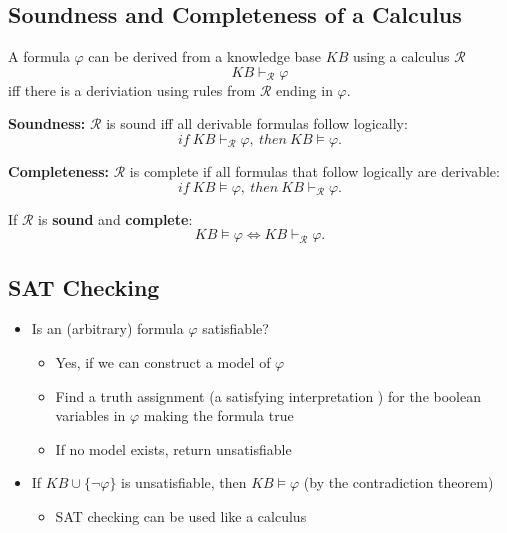 \documentclass[conference, a4paper]{styles/acmsiggraph}
\begin{document}
    
    \subsection{Soundness and Completeness of a Calculus}
        A formula $\varphi$ can be derived from a knowledge base $KB$ using a calculus $\mathcal{R}$
            $$KB \vdash_{\mathcal{R}} \varphi$$
        iff there is a deriviation using rules from $\mathcal{R}$ ending in $\varphi$.\newline
        
        \textbf{Soundness:} $\mathcal{R}$ is sound iff all derivable formulas follow logically:
            $$if \  KB \vdash_{\mathcal{R}} \varphi, \  then \  KB \vDash \varphi.$$
        
        \textbf{Completeness:} $\mathcal{R}$ is complete if all formulas that follow logically are derivable:
            $$if \  KB \vDash \varphi, \  then \  KB \vdash_{\mathcal{R}} \varphi.$$
        
        If $\mathcal{R}$ is \textbf{sound} and \textbf{complete}:
            $$KB \vDash \varphi \Leftrightarrow KB \vdash_{\mathcal{R}} \varphi.$$
    


    
    
    
    
    
    
    
    \subsection{SAT Checking}
        \begin{itemize}
            \item Is an (arbitrary) formula $\varphi$ satisfiable?
                \begin{itemize}
                    \item Yes, if we can construct a model of $\varphi$
                    \item Find a truth assignment (a satisfying interpretation ) for the boolean variables in $\varphi$ making the formula true
                    \item If no model exists, return unsatisfiable
                \end{itemize}
            \item If $KB \cup \{ \lnot \varphi \}$ is unsatisfiable, then $KB \vDash \varphi$ (by the contradiction theorem)
                \begin{itemize}
                    \item SAT checking can be used like a calculus
                \end{itemize}
        \end{itemize}
    
\end{document}
